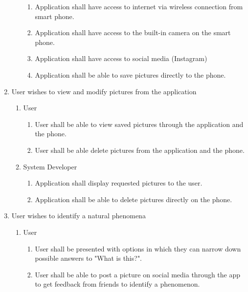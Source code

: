 \documentclass[]{article}
\begin{document}
\begin{enumerate}[{BE}1.]
\begin{enumerate}[{VP2}.1]
\begin{enumerate}
				\item Application shall have access to internet via wireless connection from smart phone.
				\item Application shall have access to the built-in camera on the smart phone.
				\item Application shall have access to social media (Instagram)
				\item Application shall be able to save pictures directly to the phone.
			\end{enumerate}
	\end{enumerate}
	\item User wishes to view and modify pictures from the application
	\begin{enumerate} [{VP3}.1]
		\item User
			\begin{enumerate}
				\item User shall be able to view saved pictures through the application and the phone.
				\item User shall be able delete pictures from the application and the phone.
			\end{enumerate}
		\item System Developer
			\begin{enumerate}
				\item Application shall display requested pictures to the user.
				\item Application shall be able to delete pictures directly on the phone.
			\end{enumerate}
	\end{enumerate}
	\item User wishes to identify a natural phenomena
	\begin{enumerate}[{VP4}.1]
		\item User
			\begin{enumerate}
				\item User shall be presented with options in which they can narrow down possible answers to "What is this?".
				\item User shall be able to post a picture on social media through the app to get feedback from friends to identify a phenomenon.
								

\end{enumerate}
\end{enumerate}
\end{enumerate}
\end{document}
